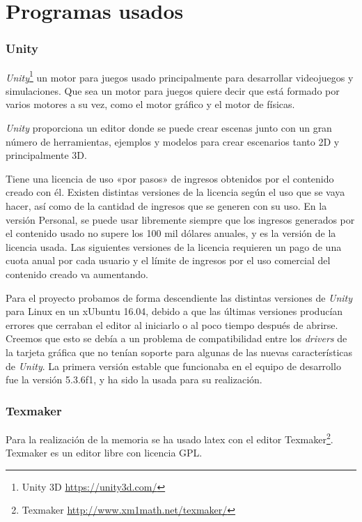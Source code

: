 
\section{Programas usados}

\subsubsection{Unity}
\textit{Unity}\footnote{Unity 3D \url{https://unity3d.com/}} un motor para juegos usado principalmente para desarrollar videojuegos y simulaciones. Que sea un motor para juegos quiere decir que está formado por varios motores a su vez, como el motor gráfico y el motor de físicas.

\textit{Unity} proporciona un editor donde se puede crear escenas junto con un gran número de herramientas, ejemplos y modelos para crear escenarios tanto 2D y principalmente 3D.

Tiene una licencia de uso «por pasos» de ingresos obtenidos por el contenido creado con él. Existen distintas versiones de la licencia según el uso que se vaya hacer, así como de la cantidad de ingresos que se generen con su uso. En la versión Personal, se puede usar libremente siempre que los ingresos generados por el contenido usado no supere los 100 mil dólares anuales, y es la versión de la licencia usada. Las siguientes versiones de la licencia requieren un pago de una cuota anual por cada usuario y el límite de ingresos por el uso comercial del contenido creado va aumentando.

Para el proyecto probamos de forma descendiente las distintas versiones de \textit{Unity} para Linux en un xUbuntu 16.04, debido a que las últimas versiones producían errores que cerraban el editor al iniciarlo o al poco tiempo después de abrirse. Creemos que esto se debía a un problema de compatibilidad entre los \textit{drivers} de la tarjeta gráfica que no tenían soporte para algunas de las nuevas características de \textit{Unity}. La primera versión estable que funcionaba en el equipo de desarrollo fue la versión 5.3.6f1, y ha sido la usada para su realización.

\subsubsection{Texmaker}
Para la realización de la memoria se ha usado latex con el editor Texmaker\footnote{Texmaker \url{http://www.xm1math.net/texmaker/}}.
Texmaker es un editor libre con licencia GPL.


